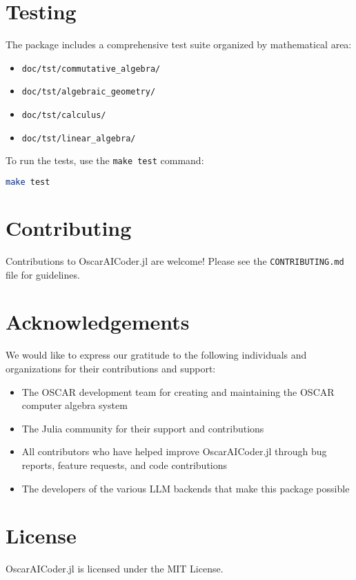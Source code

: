 \documentclass[11pt,a4paper]{article}
\begin{document}



\section{Testing}
\label{sec:testing}

The package includes a comprehensive test suite organized by mathematical area:

\begin{itemize}
    \item \texttt{doc/tst/commutative\_algebra/}
    \item \texttt{doc/tst/algebraic\_geometry/}
    \item \texttt{doc/tst/calculus/}
    \item \texttt{doc/tst/linear\_algebra/}
\end{itemize}

To run the tests, use the \texttt{make test} command:

\begin{lstlisting}[language=bash]
make test
\end{lstlisting}

\section{Contributing}
\label{sec:contributing}

Contributions to OscarAICoder.jl are welcome! Please see the \texttt{CONTRIBUTING.md} file for guidelines.

\section*{Acknowledgements}
\label{sec:acknowledgements}

We would like to express our gratitude to the following individuals and organizations for their contributions and support:

\begin{itemize}
    \item The OSCAR development team for creating and maintaining the OSCAR computer algebra system
    \item The Julia community for their support and contributions
    \item All contributors who have helped improve OscarAICoder.jl through bug reports, feature requests, and code contributions
    \item The developers of the various LLM backends that make this package possible
\end{itemize}

\section{License}
\label{sec:license}

OscarAICoder.jl is licensed under the MIT License.

\clearpage
\printindex
\end{document}
